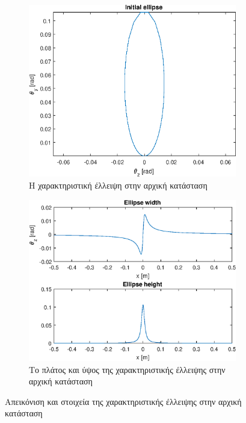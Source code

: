 \begin{figure}[tph]	
	\begin{subfigure}{0.47\textwidth}
		\includegraphics[width=\linewidth]{figures/MATLAB-variable-analysis/initial-ellipse}
		\centering
		\caption{Η χαρακτηριστική έλλειψη στην αρχική κατάσταση}
		\label{fig:MATLAB-variable-analysis-initial-ellipse}
	\end{subfigure}
	\hfill
	\begin{subfigure}{0.47\textwidth}
		\includegraphics[width=\linewidth]{figures/MATLAB-variable-analysis/initial-ellipse-height-width}
		\centering
		\caption{Το πλάτος και ύψος της χαρακτηριστικής έλλειψης στην αρχική κατάσταση}
		\label{fig:MATLAB-variable-analysis-initial-ellipse-height-width}
	\end{subfigure}
\caption{Απεικόνιση και στοιχεία της χαρακτηριστικής έλλειψης στην αρχική κατάσταση}
\label{fig:initial-ellipse}
\end{figure}

